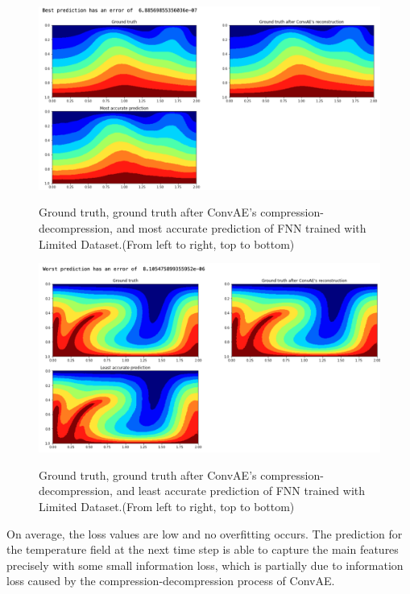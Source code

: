 \begin{figure}[H]
    \caption{Ground truth, ground truth after ConvAE's compression-decompression, and most accurate prediction of FNN trained with Limited Dataset.(From left to right, top to bottom)}
    \includegraphics[scale=0.5]{figures/mantle_convection_images/limited_dataset/FNN_Best.png}
    \label{figure:FNN_limited_best}
\end{figure}

\begin{figure}[H]
    \caption{Ground truth, ground truth after ConvAE's compression-decompression, and least accurate prediction of FNN trained with Limited Dataset.(From left to right, top to bottom)}
    \includegraphics[scale=0.5]{figures/mantle_convection_images/limited_dataset/FNN_Worst.png}
    \label{figure:FNN_limited_worst}
\end{figure}

On average, the loss values are low and no overfitting occurs. The prediction for the temperature field at the next time step is able to capture the main features precisely with some small information loss, which is partially due to information loss caused by the compression-decompression process of ConvAE.

